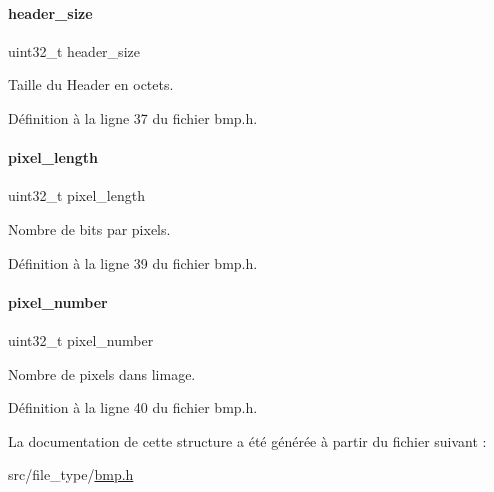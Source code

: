 \mbox{\label{a00162_a841923a20e6dda97c59351c8e97c9be6}} 
\paragraph{\texorpdfstring{header\+\_\+size}{header\_size}}
{\footnotesize\ttfamily uint32\+\_\+t header\+\_\+size}

Taille du Header en octets. 

Définition à la ligne 37 du fichier bmp.\+h.

\mbox{\label{a00162_a764a3dd695d8520703072cec417cb8b0}} 
\paragraph{\texorpdfstring{pixel\+\_\+length}{pixel\_length}}
{\footnotesize\ttfamily uint32\+\_\+t pixel\+\_\+length}

Nombre de bits par pixels. 

Définition à la ligne 39 du fichier bmp.\+h.

\mbox{\label{a00162_af0fcf1fc8e012d9794e3085c98aea38a}} 
\paragraph{\texorpdfstring{pixel\+\_\+number}{pixel\_number}}
{\footnotesize\ttfamily uint32\+\_\+t pixel\+\_\+number}

Nombre de pixels dans l\textquotesingle{}image. 

Définition à la ligne 40 du fichier bmp.\+h.



La documentation de cette structure a été générée à partir du fichier suivant \+:\begin{DoxyCompactItemize}
\item 
src/file\+\_\+type/\hyperlink{a00077}{bmp.\+h}\end{DoxyCompactItemize}

